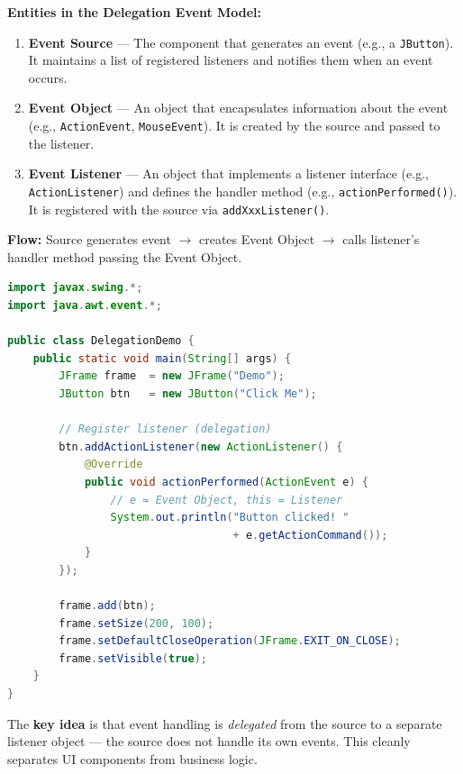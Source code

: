 \documentclass[12pt,a3paper]{article}
\begin{document}
\begin{enumerate}
\begin{tcolorbox}[enhanced,breakable,ansbox,
  colback=cC!4,colframe=cC,boxrule=0.8pt,arc=5pt,
  title={\textbf{Answer --- Java Delegation Event Handling Model}},
  fonttitle=\bfseries\color{white},colbacktitle=cC]
\textbf{Entities in the Delegation Event Model:}

\begin{enumerate}[label=\textbf{\arabic*.}, itemsep=4pt]
  \item \textbf{Event Source} --- The component that generates an event
  (e.g., a \texttt{JButton}). It maintains a list of registered
  listeners and notifies them when an event occurs.

  \item \textbf{Event Object} --- An object that encapsulates
  information about the event (e.g., \texttt{ActionEvent},
  \texttt{MouseEvent}). It is created by the source and passed to the
  listener.

  \item \textbf{Event Listener} --- An object that implements a
  listener interface (e.g., \texttt{ActionListener}) and defines the
  handler method (e.g., \texttt{actionPerformed()}). It is registered
  with the source via \texttt{addXxxListener()}.
\end{enumerate}

\textbf{Flow:} Source generates event $\to$ creates Event Object $\to$
calls listener's handler method passing the Event Object.

\begin{lstlisting}[language=Java]
import javax.swing.*;
import java.awt.event.*;

public class DelegationDemo {
    public static void main(String[] args) {
        JFrame frame  = new JFrame("Demo");
        JButton btn   = new JButton("Click Me");

        // Register listener (delegation)
        btn.addActionListener(new ActionListener() {
            @Override
            public void actionPerformed(ActionEvent e) {
                // e = Event Object, this = Listener
                System.out.println("Button clicked! "
                                   + e.getActionCommand());
            }
        });

        frame.add(btn);
        frame.setSize(200, 100);
        frame.setDefaultCloseOperation(JFrame.EXIT_ON_CLOSE);
        frame.setVisible(true);
    }
}
\end{lstlisting}

The \textbf{key idea} is that event handling is \emph{delegated} from
the source to a separate listener object --- the source does not handle
its own events. This cleanly separates UI components from business
logic.
\end{tcolorbox}



\end{enumerate}
\end{document}
